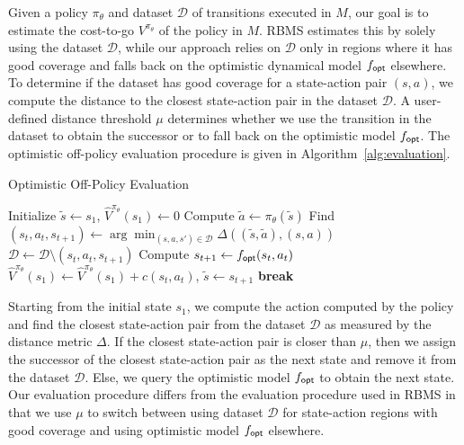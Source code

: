 Given a policy $\pi_\theta$ and dataset $\mathcal{D}$ of transitions
executed in $M$, our goal is to estimate the cost-to-go
$V^{\pi_\theta}$ of the policy in $M$. RBMS estimates this by solely
using the dataset $\mathcal{D}$, while our approach \taml{} relies on
$\mathcal{D}$ only in regions where it has good coverage and falls
back on the optimistic dynamical model $f_\mathsf{opt}$ elsewhere. To determine
if the dataset has good coverage for a state-action pair $(s, a)$, we
compute the distance to the closest state-action pair in the dataset
$\mathcal{D}$. A user-defined distance threshold $\mu$ determines
whether we use the transition in the dataset to obtain the successor
or to fall back on the optimistic model $f_\mathsf{opt}$. The
optimistic off-policy evaluation procedure is given in
Algorithm~\ref{alg:evaluation}.

\begin{algorithm}[t]
  \caption{Optimistic Off-Policy Evaluation}
  \begin{algorithmic}[1]
    \State Initialize $\tilde{s} \leftarrow s_1$, $\hat{V}^{\pi_\theta}(s_1)
    \leftarrow 0$
    \State Compute $\tilde{a} \leftarrow \pi_\theta(\tilde{s})$
    \State Find $(s_t, a_t, s_{t+1}) \leftarrow \arg\min_{(s, a, s')
      \in \mathcal{D}} \Delta((\tilde{s}, \tilde{a}), (s, a))$
    \State $\mathcal{D} \leftarrow \mathcal{D} \setminus (s_t, a_t,
    s_{t+1})$
    \Else
    \State Compute $s_{t+1} \leftarrow f_\mathsf{opt}(s_t, a_t)$
    \EndIf
    \State $\hat{V}^{\pi_\theta}(s_1) \leftarrow  \hat{V}^{\pi_\theta}(s_1) + c(s_t, a_t)$,
    $\tilde{s} \leftarrow s_{t+1}$
    \State \textbf{break}
    \EndIf
    \EndFor \\
  \end{algorithmic}
  \label{alg:evaluation}
\end{algorithm}

Starting from the initial state $s_1$, we compute the action computed
by the policy and find the closest state-action pair from the dataset
$\mathcal{D}$ as measured by the distance metric $\Delta$. If the
closest state-action pair is closer than $\mu$, then we assign the
successor of the closest state-action pair as the next state and
remove it from the dataset $\mathcal{D}$. Else, we query
the optimistic model $f_\mathsf{opt}$ to obtain the next state. Our evaluation
procedure differs from the evaluation procedure used in RBMS in that
we use $\mu$ to switch between using dataset $\mathcal{D}$ for
state-action regions with good coverage and using optimistic model
$f_\mathsf{opt}$ elsewhere.

